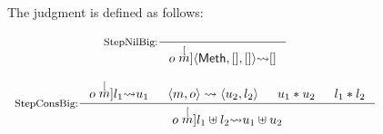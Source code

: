 \begin{definition}
  \label{def-sembigstep}
  The judgment  is defined as follows:
  \begin{center}
    \begin{math}
      \begin{array}{c}
        \inference[StepNilBig:]{}
                  {\sembigstep{m}{o}{\emptymap}{\semlbl{\alphameth}{\emptymap}{\emptymap}}} \\
        \mbox{} \\
        \inference[StepConsBig:]{\sembigstep{m}{o}{u_1}{l_1} & \sembigssr{m}{o}{u_2}{l_2}
          & \sdisj{u_1}{u_2} & \ldisj{l_1}{l_2}}
                  {\sembigstep{m}{o}{\splus{u_1}{u_2}}{\lplus{l_1}{l_2}}} \\
        \mbox{} \\
      \end{array}
    \end{math}
  \end{center}
\end{definition}

